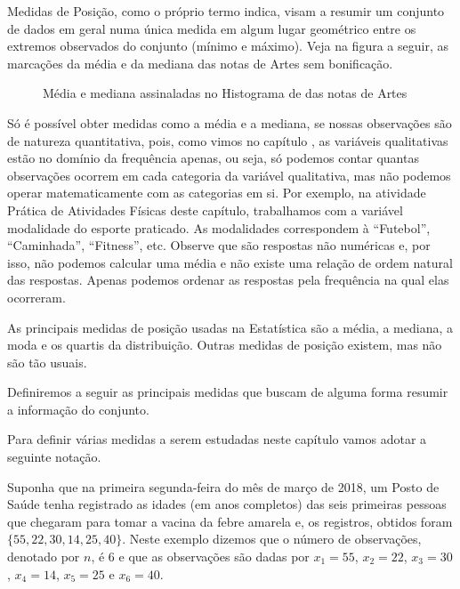 \label{\detokenize{PE104-1:sec-organizando1}}\label{\detokenize{PE104-1::doc}}\label{\detokenize{PE104-1:organizando-as-ideias-medidas-de-posicao}}
Medidas de Posição, como o próprio termo indica, visam a resumir um conjunto de dados em geral numa única medida em algum lugar geométrico entre os extremos observados do conjunto (mínimo e máximo). Veja na figura a seguir, as marcações da média e da mediana das notas de Artes sem bonificação.

\begin{figure}[H]
\centering
\capstart

\noindent{}
\caption{Média e mediana assinaladas no Histograma de das notas de Artes}\label{\detokenize{PE104-1:fig-coloque-aqui-o-nome}}\label{\detokenize{PE104-1:id6}}\end{figure}

Só é possível obter medidas como a média e a mediana, se nossas observações são de natureza quantitativa, pois, como vimos no capítulo
, as variáveis qualitativas estão no domínio da frequência apenas, ou seja, só podemos contar quantas observações ocorrem em cada categoria da variável qualitativa, mas não podemos operar matematicamente com as categorias em si. Por exemplo, na atividade Prática de Atividades Físicas deste capítulo, trabalhamos com a variável modalidade do esporte praticado. As modalidades correspondem à “Futebol”, “Caminhada”, “Fitness”, etc. Observe que são respostas não numéricas e, por isso, não podemos calcular uma média e não existe uma relação de ordem natural das respostas. Apenas podemos ordenar as respostas pela frequência na qual elas ocorreram.

As principais medidas de posição usadas na Estatística são a média, a mediana, a moda e os quartis da distribuição. Outras medidas de posição existem, mas não são tão usuais.

Definiremos a seguir as principais medidas que buscam de alguma forma resumir a informação do conjunto.

Para definir várias medidas a serem estudadas neste capítulo vamos adotar a seguinte notação.

Suponha que na primeira segunda-feira do mês de março de 2018, um Posto de Saúde tenha registrado as idades (em anos completos) das seis primeiras pessoas que chegaram para tomar a vacina da febre amarela e, os registros, obtidos foram \(\{55, 22, 30, 14, 25, 40\}\). Neste exemplo dizemos que o número de observações, denotado por \(n\), é \(6\) e que as observações são dadas por \(x_1=55\), \(x_2=22\), \(x_3=30\), \(x_4=14\), \(x_5=25\) e \(x_6=40\).

